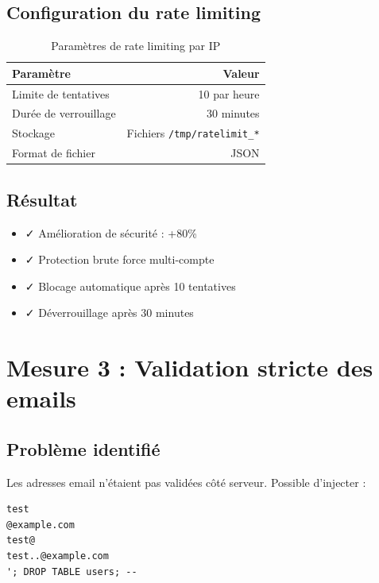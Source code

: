 \documentclass[11pt,a4paper,french]{report}
\begin{document}
\subsection{Configuration du rate limiting}

\begin{table}[H]
\centering
\caption{Paramètres de rate limiting par IP}
\begin{tabular}{|l|r|}
\hline
\textbf{Paramètre} & \textbf{Valeur} \\
\hline
Limite de tentatives & 10 par heure \\
\hline
Durée de verrouillage & 30 minutes \\
\hline
Stockage & Fichiers \texttt{/tmp/ratelimit\_*} \\
\hline
Format de fichier & JSON \\
\hline
\end{tabular}
\end{table}

\subsection{Résultat}

\begin{itemize}
    \item ✓ Amélioration de sécurité : +80\%
    \item ✓ Protection brute force multi-compte
    \item ✓ Blocage automatique après 10 tentatives
    \item ✓ Déverrouillage après 30 minutes
\end{itemize}

\newpage

\section{Mesure 3 : Validation stricte des emails}

\subsection{Problème identifié}

Les adresses email n'étaient pas validées côté serveur. Possible d'injecter :

\begin{lstlisting}
test
@example.com
test@
test..@example.com
'; DROP TABLE users; --
\end{lstlisting}
\end{document}
